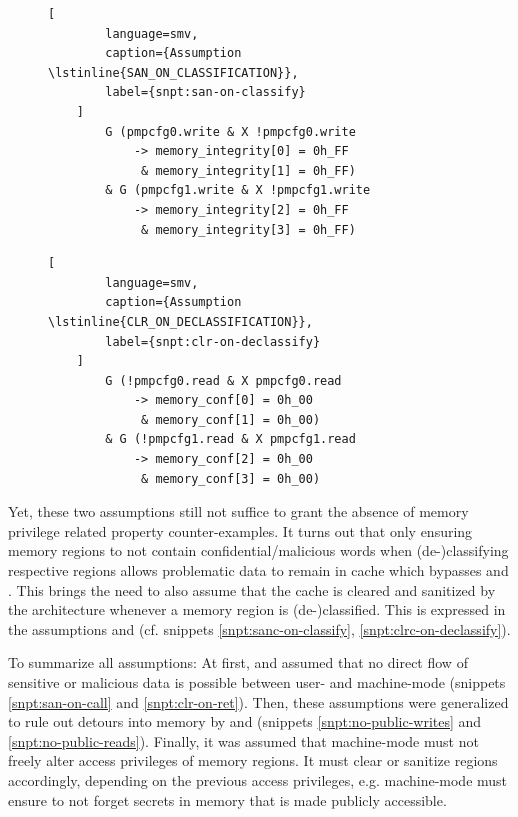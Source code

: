 \begin{figure}
    \begin{lstlisting}[
        language=smv,
        caption={Assumption \lstinline{SAN_ON_CLASSIFICATION}},
        label={snpt:san-on-classify}
    ]
        G (pmpcfg0.write & X !pmpcfg0.write
            -> memory_integrity[0] = 0h_FF
             & memory_integrity[1] = 0h_FF)
        & G (pmpcfg1.write & X !pmpcfg1.write
            -> memory_integrity[2] = 0h_FF
             & memory_integrity[3] = 0h_FF)
    \end{lstlisting}

    \begin{lstlisting}[
        language=smv,
        caption={Assumption \lstinline{CLR_ON_DECLASSIFICATION}},
        label={snpt:clr-on-declassify}
    ]
        G (!pmpcfg0.read & X pmpcfg0.read
            -> memory_conf[0] = 0h_00
             & memory_conf[1] = 0h_00)
        & G (!pmpcfg1.read & X pmpcfg1.read
            -> memory_conf[2] = 0h_00
             & memory_conf[3] = 0h_00)
    \end{lstlisting}
\end{figure}

Yet, these two assumptions still not suffice to grant the absence of memory privilege related property counter-examples.
It turns out that only ensuring memory regions to not contain confidential/malicious words when (de-)classifying respective regions allows problematic data to remain in cache which bypasses  and .
This brings the need to also assume that the cache is cleared and sanitized by the architecture whenever a memory region is (de-)classified.
This is expressed in the assumptions  and  (cf. snippets \ref{snpt:sanc-on-classify}, \ref{snpt:clrc-on-declassify}).

To summarize all assumptions:
At first,  and  assumed that no direct flow of sensitive or malicious data is possible between user- and machine-mode (snippets \ref{snpt:san-on-call} and \ref{snpt:clr-on-ret}).
Then, these assumptions were generalized to rule out detours into memory by  and  (snippets \ref{snpt:no-public-writes} and \ref{snpt:no-public-reads}).
Finally, it was assumed that machine-mode must not freely alter access privileges of memory regions.
It must clear or sanitize regions accordingly, depending on the previous access privileges, e.g. machine-mode must ensure to not forget secrets in memory that is made publicly accessible.

